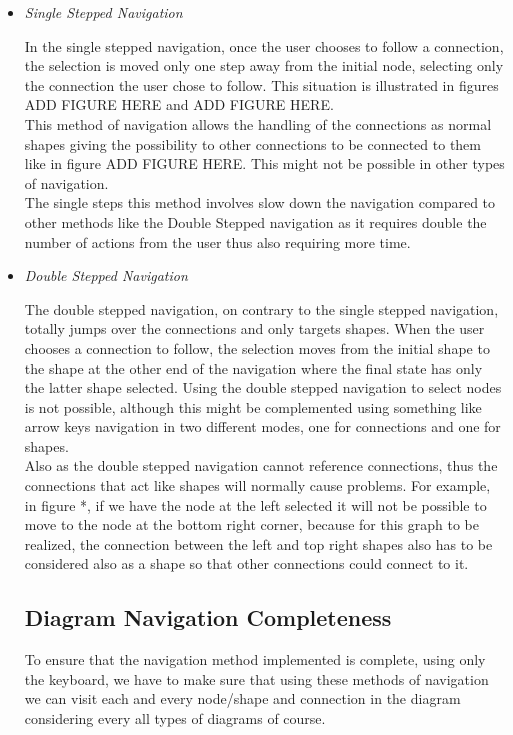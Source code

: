 \begin{itemize}
\item {\it Single Stepped Navigation}
\par \noindent
In the single stepped navigation, once the user chooses to follow a connection, the selection is moved only one step away from the initial node, selecting only the connection the user chose to follow. This situation is illustrated in figures ADD FIGURE HERE and ADD FIGURE HERE.\\
This method of navigation allows the handling of the connections as normal shapes giving the possibility to other connections to be connected to them like in figure ADD FIGURE HERE. This might not be possible in other types of navigation.\\
The single steps this method involves slow down the navigation compared to other methods like the Double Stepped navigation as it requires double the number of actions from the user thus also requiring more time.


\item {\it Double Stepped Navigation}
\par \noindent
The double stepped navigation, on contrary to the single stepped navigation, totally jumps over the connections and only targets shapes. When the user chooses a connection to follow, the selection moves from the initial shape to the shape at the other end of the navigation where the final state has only the latter shape selected. Using the double stepped navigation to select nodes is not possible, although this might be complemented using something like arrow keys navigation in two different modes, one for connections and one for shapes.\\
Also as the double stepped navigation cannot reference connections, thus the connections that act like shapes will normally cause problems. For example, in figure *, if we have the node at the left selected it will not be possible to move to the node at the bottom right corner, because for this graph to be realized, the connection between the left and top right shapes also has to be considered also as a shape so that other connections could connect to it.

\subsection{Diagram Navigation Completeness}
To ensure that the navigation method implemented is complete, using only the keyboard, we have to make sure that using these methods of navigation we can visit each and every node/shape and connection in the diagram considering every all types of diagrams of course.


\end{itemize}
